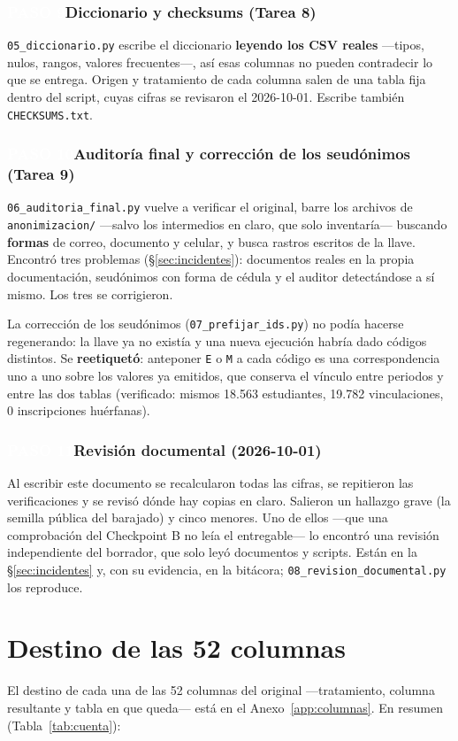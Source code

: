 \documentclass[11pt,a4paper,twoside,twocolumn]{article}
\newcommand{\cod}[1]{\nolinkurl{#1}}
\newcommand{\paso}[2]{\subsubsection*{\colorbox{ustaAzul}{\textcolor{white}{\scriptsize\sffamily\bfseries PASO #1}}\enspace #2}}
\begin{document}
\paso{9}{Diccionario y checksums (Tarea 8)}

\cod{05_diccionario.py} escribe el diccionario \textbf{leyendo los CSV reales} ---tipos, nulos,
rangos, valores frecuentes---, así esas columnas no pueden contradecir lo que se entrega. Origen y
tratamiento de cada columna salen de una tabla fija dentro del script, cuyas cifras se revisaron
el 2026-10-01. Escribe también \cod{CHECKSUMS.txt}.

\paso{10}{Auditoría final y corrección de los seudónimos (Tarea 9)}

\cod{06_auditoria_final.py} vuelve a verificar el original, barre los archivos de
\cod{anonimizacion/} ---salvo los intermedios en claro, que solo inventaría--- buscando
\textbf{formas} de correo, documento y celular, y busca rastros escritos de la llave. Encontró
tres problemas (§\ref{sec:incidentes}): documentos reales en la propia documentación, seudónimos
con forma de cédula y el auditor detectándose a sí mismo. Los tres se corrigieron.

La corrección de los seudónimos (\cod{07_prefijar_ids.py}) no podía hacerse regenerando: la llave
ya no existía y una nueva ejecución habría dado códigos distintos. Se \textbf{reetiquetó}:
anteponer \cod{E} o \cod{M} a cada código es una correspondencia uno a uno sobre los valores ya
emitidos, que conserva el vínculo entre periodos y entre las dos tablas (verificado: mismos
18.563 estudiantes, 19.782 vinculaciones, 0 inscripciones huérfanas).

\paso{11}{Revisión documental (2026-10-01)}

Al escribir este documento se recalcularon todas las cifras, se repitieron las verificaciones y se
revisó dónde hay copias en claro. Salieron un hallazgo grave (la semilla pública del barajado) y
cinco menores. Uno de ellos ---que una comprobación del Checkpoint B no leía el entregable--- lo
encontró una revisión independiente del borrador, que solo leyó documentos y scripts. Están en la §\ref{sec:incidentes} y,
con su evidencia, en la bitácora; \cod{08_revision_documental.py} los reproduce.

\section{Destino de las 52 columnas}\label{sec:columnas}

El destino de cada una de las 52 columnas del original ---tratamiento, columna resultante y tabla
en que queda--- está en el Anexo~\ref{app:columnas}. En resumen (Tabla~\ref{tab:cuenta}):
\end{document}
